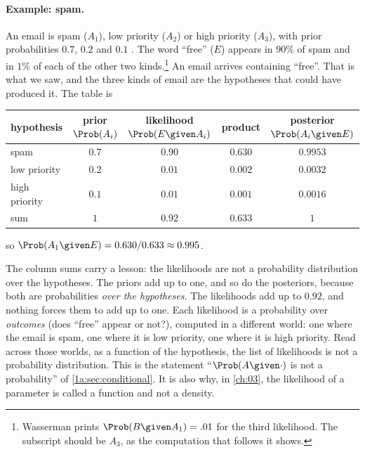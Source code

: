 \paragraph{Example: spam.}
An email is spam ($A_1$), low priority ($A_2$) or high priority ($A_3$), with
prior probabilities $0.7$, $0.2$ and $0.1$ . The
word ``free'' ($E$) appears in $90\%$ of spam and in $1\%$ of each of the other
two kinds.\footnote{Wasserman prints $\Prob(B\given A_1)=.01$ for the third
likelihood. The subscript should be $A_3$, as the computation that follows it
shows.} An email arrives containing ``free''. That is what we saw, and the three
kinds of email are the hypotheses that could have produced it. The table is
\begin{center}
\small
\begin{tabular}{@{}lcccc@{}}
\toprule
hypothesis & prior $\Prob(A_i)$ & likelihood $\Prob(E\given A_i)$ & product & posterior $\Prob(A_i\given E)$\\
\midrule
spam          & $0.7$ & $0.90$ & $0.630$ & $0.9953$\\
low priority  & $0.2$ & $0.01$ & $0.002$ & $0.0032$\\
high priority & $0.1$ & $0.01$ & $0.001$ & $0.0016$\\
\midrule
sum           & $1$   & $0.92$ & $0.633$ & $1$\\
\bottomrule
\end{tabular}
\end{center}
so $\Prob(A_1\given E)=0.630/0.633\approx0.995$.

The column sums carry a lesson: the likelihoods are not a probability
distribution over the hypotheses. The priors add up to one, and so do the
posteriors, because both are probabilities \emph{over the hypotheses}. The
likelihoods add up to $0.92$, and nothing forces them to add up to one. Each
likelihood is a probability over \emph{outcomes} (does ``free'' appear or not?),
computed in a different world: one where the email is spam, one where it is low
priority, one where it is high priority. Read across those worlds, as a
function of the hypothesis, the list of likelihoods is not a probability
distribution. This is the statement ``$\Prob(A\given\cdot)$ is not a probability''
of \cref{1a:sec:conditional}. It is also why, in \cref{ch:03}, the likelihood of
a parameter is called a function and not a density.

